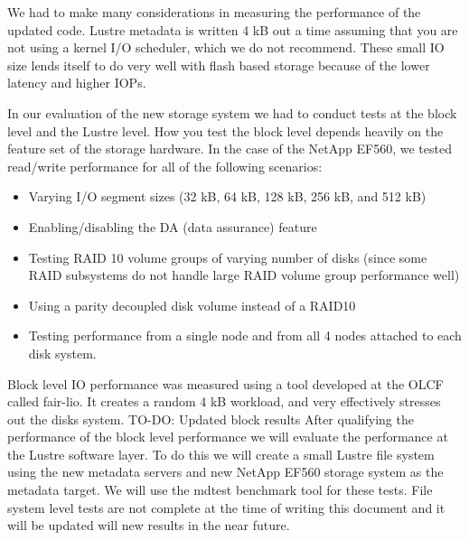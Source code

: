 \documentclass[conference,compsoc]{IEEEtran}
\newcommand\todo[1]{{\color{red}#1}}
\begin{document}
We had to make many considerations in measuring the performance of the updated
code. Lustre metadata is written 4 kB out a time assuming that you are not
using a kernel I/O scheduler, which we do not recommend. These small IO size
lends itself to do very well with flash based storage because of the lower
latency and higher IOPs.

In our evaluation of the new storage system we had to conduct tests at the
block level and the Lustre level. How you test the block level depends heavily
on the feature set of the storage hardware. In the case of the NetApp EF560, we
tested read/write performance for all of the following scenarios:

\begin{itemize}

\item Varying I/O segment sizes (32 kB, 64 kB, 128 kB, 256 kB, and 512 kB)

\item Enabling/disabling the DA (data assurance) feature

\item Testing RAID 10 volume groups of varying number of disks (since some RAID subsystems do not handle large RAID volume group performance well)

\item Using a parity decoupled disk volume instead of a RAID10

\item Testing performance from a single node and from all 4 nodes attached to each disk system.

\end{itemize}

Block level IO performance was measured using a tool developed at the OLCF
called fair-lio. It creates a random 4 kB workload, and very effectively
stresses out the disks system. \todo{TO-DO: Updated block results}
After qualifying the performance of the block level performance we will
evaluate the performance at the Lustre software layer. To do this we will
create a small Lustre file system using the new metadata servers and new NetApp
EF560 storage system as the metadata target. We will use the mdtest benchmark
tool for these tests. File system level tests are not complete at the time of
writing this document and it will be updated will new results in the near
future.

\end{document}
